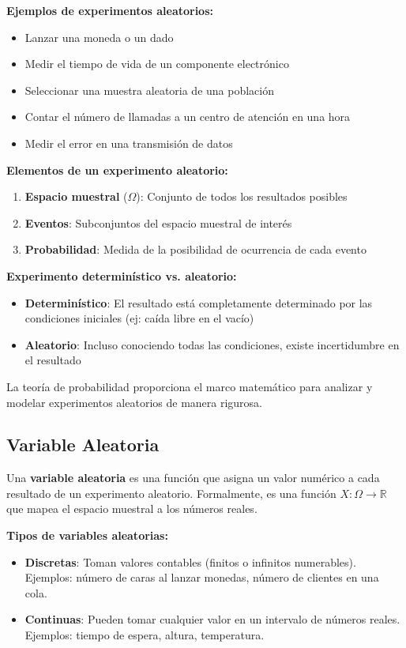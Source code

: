 \documentclass[12pt,a4paper]{article}
\begin{document}
\textbf{Ejemplos de experimentos aleatorios:}
\begin{itemize}
    \item Lanzar una moneda o un dado
    \item Medir el tiempo de vida de un componente electrónico
    \item Seleccionar una muestra aleatoria de una población
    \item Contar el número de llamadas a un centro de atención en una hora
    \item Medir el error en una transmisión de datos
\end{itemize}

\textbf{Elementos de un experimento aleatorio:}
\begin{enumerate}
    \item \textbf{Espacio muestral} ($\Omega$): Conjunto de todos los resultados posibles
    \item \textbf{Eventos}: Subconjuntos del espacio muestral de interés
    \item \textbf{Probabilidad}: Medida de la posibilidad de ocurrencia de cada evento
\end{enumerate}

\textbf{Experimento determinístico vs. aleatorio:}
\begin{itemize}
    \item \textbf{Determinístico}: El resultado está completamente determinado por las condiciones iniciales (ej: caída libre en el vacío)
    \item \textbf{Aleatorio}: Incluso conociendo todas las condiciones, existe incertidumbre en el resultado
\end{itemize}

La teoría de probabilidad proporciona el marco matemático para analizar y modelar experimentos aleatorios de manera rigurosa.

\subsection{Variable Aleatoria}

Una \textbf{variable aleatoria} es una función que asigna un valor numérico a cada resultado de un experimento aleatorio. Formalmente, es una función $X: \Omega \rightarrow \mathbb{R}$ que mapea el espacio muestral a los números reales.

\textbf{Tipos de variables aleatorias:}
\begin{itemize}
    \item \textbf{Discretas}: Toman valores contables (finitos o infinitos numerables). Ejemplos: número de caras al lanzar monedas, número de clientes en una cola.
    \item \textbf{Continuas}: Pueden tomar cualquier valor en un intervalo de números reales. Ejemplos: tiempo de espera, altura, temperatura.
\end{itemize}
\end{document}
